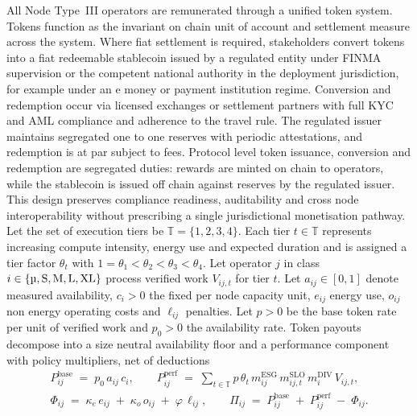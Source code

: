 \documentclass[oneside,10pt]{swissi}
\begin{document}
All Node Type~III operators are remunerated through a unified token system. Tokens function as the invariant on chain unit of account and settlement measure across the system. Where fiat settlement is required, stakeholders convert tokens into a fiat redeemable stablecoin issued by a regulated entity under FINMA supervision or the competent national authority in the deployment jurisdiction, for example under an e money or payment institution regime. Conversion and redemption occur via licensed exchanges or settlement partners with full KYC and AML compliance and adherence to the travel rule. The regulated issuer maintains segregated one to one reserves with periodic attestations, and redemption is at par subject to fees. Protocol level token issuance, conversion and redemption are segregated duties: rewards are minted on chain to operators, while the stablecoin is issued off chain against reserves by the regulated issuer. This design preserves compliance readiness, auditability and cross node interoperability without prescribing a single jurisdictional monetisation pathway. Let the set of execution tiers be \(\mathbb{T}=\{1,2,3,4\}\). Each tier \(t\in\mathbb{T}\) represents increasing compute intensity, energy use and expected duration and is assigned a tier factor \(\theta_t\) with \(1=\theta_1<\theta_2<\theta_3<\theta_4\). Let operator \(j\) in class \(i\in\{\text{\textmu},\mathrm{S},\mathrm{M},\mathrm{L},\mathrm{XL}\}\) process verified work \(V_{ij,t}\) for tier \(t\). Let \(a_{ij}\in[0,1]\) denote measured availability, \(c_i>0\) the fixed per node capacity unit, \(e_{ij}\) energy use, \(o_{ij}\) non energy operating costs and \(\ell_{ij}\) penalties. Let \(p>0\) be the base token rate per unit of verified work and \(p_0>0\) the availability rate. Token payouts decompose into a size neutral availability floor and a performance component with policy multipliers, net of deductions
\begin{align}
P^{\mathrm{base}}_{ij} \;=\; p_0\, a_{ij}\, c_i,
\qquad
P^{\mathrm{perf}}_{ij} \;=\; \sum_{t\in\mathbb{T}} p\,\theta_t\, m^{\mathrm{ESG}}_{ij}\, m^{\mathrm{SLO}}_{ij,t}\, m^{\mathrm{DIV}}_{i}\, V_{ij,t},
\label{eq:token-parts}
\\
\Phi_{ij} \;=\; \kappa_e\, e_{ij} \;+\; \kappa_o\, o_{ij} \;+\; \varphi\, \ell_{ij},
\qquad
\Pi_{ij} \;=\; P^{\mathrm{base}}_{ij} \;+\; P^{\mathrm{perf}}_{ij} \;-\; \Phi_{ij}.
\label{eq:token-net}
\end{align}
\end{document}

